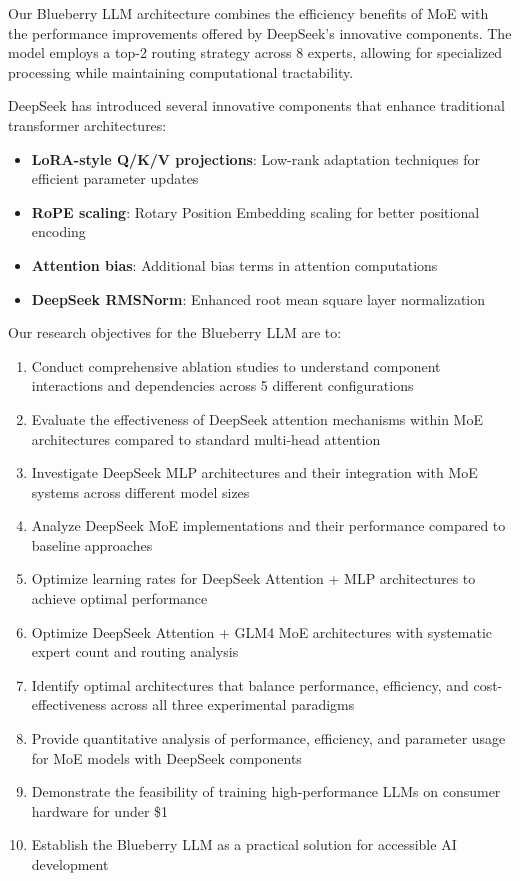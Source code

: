 \documentclass[11pt,a4paper]{article}
\begin{document}
Our Blueberry LLM architecture combines the efficiency benefits of MoE with the performance improvements offered by DeepSeek's innovative components. The model employs a top-2 routing strategy across 8 experts, allowing for specialized processing while maintaining computational tractability.

DeepSeek has introduced several innovative components that enhance traditional transformer architectures:
\begin{itemize}
    \item \textbf{LoRA-style Q/K/V projections}: Low-rank adaptation techniques for efficient parameter updates
    \item \textbf{RoPE scaling}: Rotary Position Embedding scaling for better positional encoding
    \item \textbf{Attention bias}: Additional bias terms in attention computations
    \item \textbf{DeepSeek RMSNorm}: Enhanced root mean square layer normalization
\end{itemize}

Our research objectives for the Blueberry LLM are to:
\begin{enumerate}
    \item Conduct comprehensive ablation studies to understand component interactions and dependencies across 5 different configurations
    \item Evaluate the effectiveness of DeepSeek attention mechanisms within MoE architectures compared to standard multi-head attention
    \item Investigate DeepSeek MLP architectures and their integration with MoE systems across different model sizes
    \item Analyze DeepSeek MoE implementations and their performance compared to baseline approaches
    \item Optimize learning rates for DeepSeek Attention + MLP architectures to achieve optimal performance
    \item Optimize DeepSeek Attention + GLM4 MoE architectures with systematic expert count and routing analysis
    \item Identify optimal architectures that balance performance, efficiency, and cost-effectiveness across all three experimental paradigms
    \item Provide quantitative analysis of performance, efficiency, and parameter usage for MoE models with DeepSeek components
    \item Demonstrate the feasibility of training high-performance LLMs on consumer hardware for under \$1
    \item Establish the Blueberry LLM as a practical solution for accessible AI development
\end{enumerate}
\end{document}
